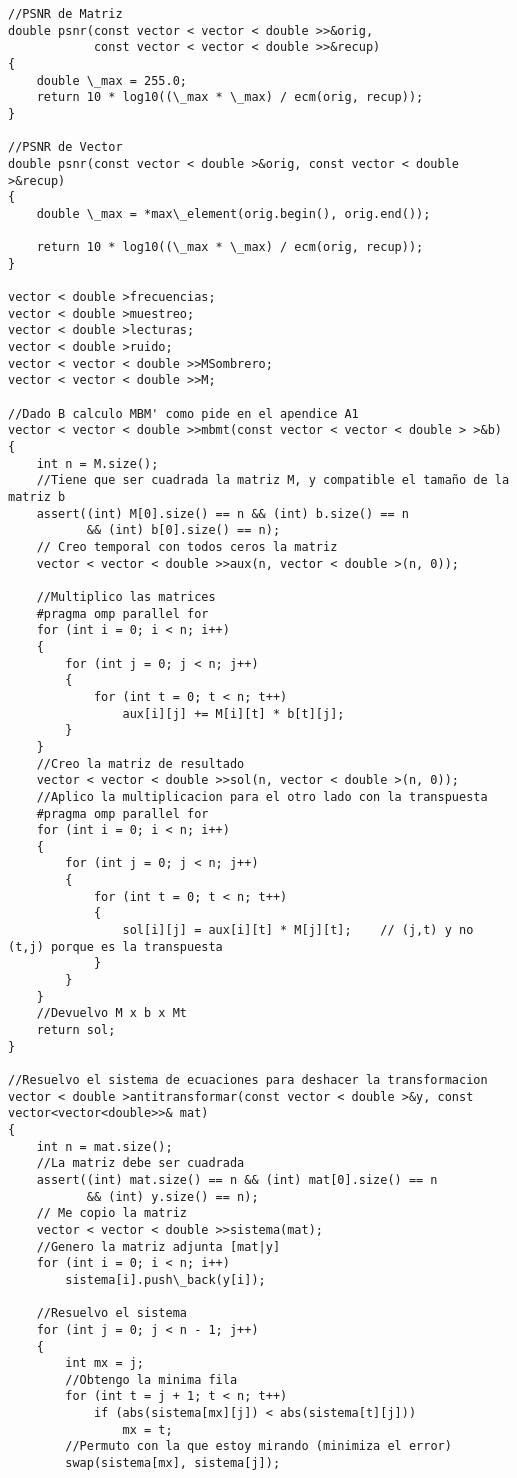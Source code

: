 \begin{lstlisting}
//PSNR de Matriz
double psnr(const vector < vector < double >>&orig,
            const vector < vector < double >>&recup)
{
    double \_max = 255.0;
    return 10 * log10((\_max * \_max) / ecm(orig, recup));
}

//PSNR de Vector
double psnr(const vector < double >&orig, const vector < double >&recup)
{
    double \_max = *max\_element(orig.begin(), orig.end());

    return 10 * log10((\_max * \_max) / ecm(orig, recup));
}

vector < double >frecuencias;
vector < double >muestreo;
vector < double >lecturas;
vector < double >ruido;
vector < vector < double >>MSombrero;
vector < vector < double >>M;

//Dado B calculo MBM' como pide en el apendice A1
vector < vector < double >>mbmt(const vector < vector < double > >&b)
{
    int n = M.size();
    //Tiene que ser cuadrada la matriz M, y compatible el tamaño de la matriz b
    assert((int) M[0].size() == n && (int) b.size() == n
           && (int) b[0].size() == n);
    // Creo temporal con todos ceros la matriz
    vector < vector < double >>aux(n, vector < double >(n, 0));

    //Multiplico las matrices
    #pragma omp parallel for
    for (int i = 0; i < n; i++)
    {
        for (int j = 0; j < n; j++)
        {
            for (int t = 0; t < n; t++)
                aux[i][j] += M[i][t] * b[t][j];
        }
    }
    //Creo la matriz de resultado
    vector < vector < double >>sol(n, vector < double >(n, 0));
    //Aplico la multiplicacion para el otro lado con la transpuesta
    #pragma omp parallel for
    for (int i = 0; i < n; i++)
    {
        for (int j = 0; j < n; j++)
        {
            for (int t = 0; t < n; t++)
            {
                sol[i][j] = aux[i][t] * M[j][t];	// (j,t) y no (t,j) porque es la transpuesta
            }
        }
    }
    //Devuelvo M x b x Mt
    return sol;
}

//Resuelvo el sistema de ecuaciones para deshacer la transformacion
vector < double >antitransformar(const vector < double >&y, const vector<vector<double>>& mat)
{
    int n = mat.size();
    //La matriz debe ser cuadrada
    assert((int) mat.size() == n && (int) mat[0].size() == n
           && (int) y.size() == n);
    // Me copio la matriz
    vector < vector < double >>sistema(mat);
    //Genero la matriz adjunta [mat|y]
    for (int i = 0; i < n; i++)
        sistema[i].push\_back(y[i]);

    //Resuelvo el sistema
    for (int j = 0; j < n - 1; j++)
    {
        int mx = j;
        //Obtengo la minima fila
        for (int t = j + 1; t < n; t++)
            if (abs(sistema[mx][j]) < abs(sistema[t][j]))
                mx = t;
        //Permuto con la que estoy mirando (minimiza el error)
        swap(sistema[mx], sistema[j]);


\end{lstlisting}
